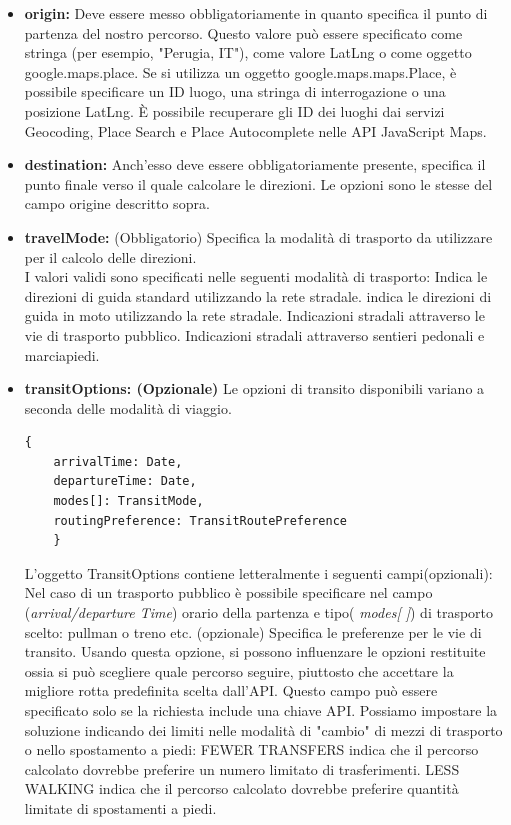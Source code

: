 \documentclass[]{scrartcl}
\begin{document}
\begin{itemize}
	\item \textbf{origin: }Deve essere messo obbligatoriamente in quanto specifica il punto di partenza del nostro percorso. Questo valore può essere specificato come stringa (per esempio, "Perugia, IT"), come valore LatLng o come oggetto google.maps.place. Se si utilizza un oggetto google.maps.maps.Place, è possibile specificare un ID luogo, una stringa di interrogazione o una posizione LatLng. È possibile recuperare gli ID dei luoghi dai servizi Geocoding, Place Search e Place Autocomplete nelle API JavaScript Maps.
	\item \textbf{destination: }Anch'esso deve essere obbligatoriamente presente, specifica il punto finale verso il quale calcolare le direzioni. Le opzioni sono le stesse del campo origine descritto sopra.
	\item \textbf{travelMode: }(Obbligatorio) Specifica la modalità di trasporto da utilizzare per il calcolo delle direzioni.\\I valori validi sono specificati nelle seguenti modalità di trasporto:
	Indica le direzioni di guida standard utilizzando la rete stradale.
	indica le direzioni di guida in moto utilizzando la rete stradale.
	Indicazioni stradali attraverso le vie di trasporto pubblico.
	Indicazioni stradali attraverso sentieri pedonali e marciapiedi.
	\item {\textbf{transitOptions: (Opzionale)} }Le opzioni di transito disponibili  variano a seconda delle modalità di viaggio. 
	 \begin{lstlisting}[frame=trBL]
	{
	arrivalTime: Date,
	departureTime: Date,
	modes[]: TransitMode,
	routingPreference: TransitRoutePreference
	}
	\end{lstlisting}
	L'oggetto TransitOptions contiene letteralmente i seguenti campi(opzionali):\\
		Nel caso di un trasporto pubblico è possibile specificare nel campo (\textit{arrival/departure Time}) orario della partenza e tipo( \textit{modes[ ]}) di trasporto scelto: pullman o treno etc.
     (opzionale) Specifica le preferenze per le vie di transito. Usando questa opzione, si possono influenzare le opzioni restituite ossia si può scegliere quale percorso seguire, piuttosto che accettare la migliore rotta predefinita scelta dall'API. Questo campo può essere specificato solo se la richiesta include una chiave API. Possiamo impostare la soluzione indicando dei limiti nelle modalità di "cambio" di mezzi di trasporto o nello spostamento a piedi:
   \subsubitem FEWER TRANSFERS indica che il percorso calcolato dovrebbe preferire un numero limitato di trasferimenti.
    \subsubitem LESS WALKING indica che il percorso calcolato dovrebbe preferire quantità limitate di spostamenti a piedi.


\end{itemize}
\end{document}

